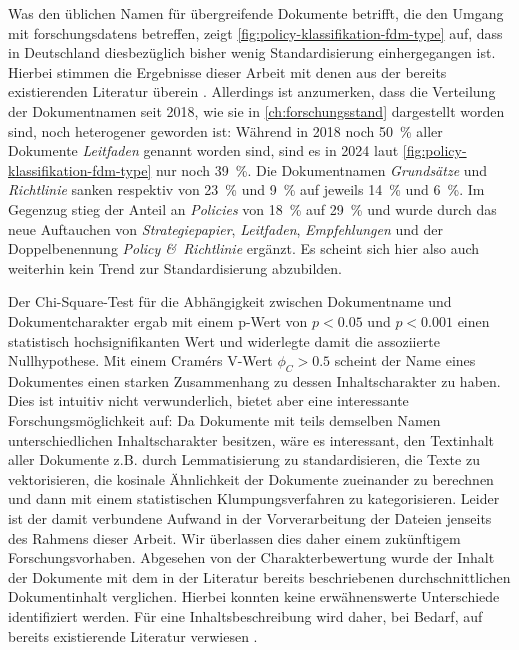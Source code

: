 Was den üblichen Namen für übergreifende Dokumente betrifft, die den Umgang mit \glspl{forschungsdaten} betreffen, zeigt \cref{fig:policy-klassifikation-fdm-type} auf, dass in Deutschland diesbezüglich bisher wenig Standardisierung einhergegangen ist.
Hierbei stimmen die Ergebnisse dieser Arbeit mit denen aus der bereits existierenden Literatur überein \autocite{Hiemenz2018-fdm-title,Hiemenz2018-fdm-report}.
Allerdings ist anzumerken, dass die Verteilung der Dokumentnamen seit 2018, wie sie in \cref{ch:forschungsstand} dargestellt worden sind, noch heterogener geworden ist:
Während in 2018 noch \SI{50}{\percent} aller Dokumente \textit{Leitfaden} genannt worden sind, sind es in 2024 laut \cref{fig:policy-klassifikation-fdm-type} nur noch \SI{39}{\percent}.
Die Dokumentnamen \textit{Grundsätze} und \textit{Richtlinie} sanken respektiv von \SI{23}{\percent} und \SI{9}{\percent} auf jeweils \SI{14}{\percent} und \SI{6}{\percent}.
Im Gegenzug stieg der Anteil an \textit{Policies} von \SI{18}{\percent} auf \SI{29}{\percent} und wurde durch das neue Auftauchen von \textit{Strategiepapier}, \textit{Leitfaden}, \textit{Empfehlungen} und der Doppelbenennung \textit{Policy \&\ Richtlinie} ergänzt.
Es scheint sich hier also auch weiterhin kein Trend zur Standardisierung abzubilden.

Der Chi-Square-Test für die Abhängigkeit zwischen Dokumentname und Dokumentcharakter ergab mit einem p-Wert von $p<\num{0.05}$ und $p<\num{0.001}$ einen statistisch hochsignifikanten Wert und widerlegte damit die assoziierte Nullhypothese.
Mit einem Cramérs V-Wert $\phi_C>\num{0,5}$ scheint der Name eines Dokumentes einen starken Zusammenhang zu dessen Inhaltscharakter zu haben.
Dies ist intuitiv nicht verwunderlich, bietet aber eine interessante Forschungsmöglichkeit auf:
Da Dokumente mit teils demselben Namen unterschiedlichen Inhaltscharakter besitzen, wäre es interessant, den Textinhalt aller Dokumente z.B. durch Lemmatisierung zu standardisieren, die Texte zu vektorisieren, die kosinale Ähnlichkeit der Dokumente zueinander zu berechnen und dann mit einem statistischen Klumpungsverfahren zu kategorisieren.
Leider ist der damit verbundene Aufwand in der Vorverarbeitung der Dateien jenseits des Rahmens dieser Arbeit.
Wir überlassen dies daher einem zukünftigem Forschungsvorhaben.
Abgesehen von der Charakterbewertung wurde der Inhalt der Dokumente mit dem in der Literatur bereits beschriebenen durchschnittlichen Dokumentinhalt verglichen.
Hierbei konnten keine erwähnenswerte Unterschiede identifiziert werden.
Für eine Inhaltsbeschreibung wird daher, bei Bedarf, auf bereits existierende Literatur verwiesen \autocite{Hiemenz2018-fdm-title,Hiemenz2018-fdm-report}.

